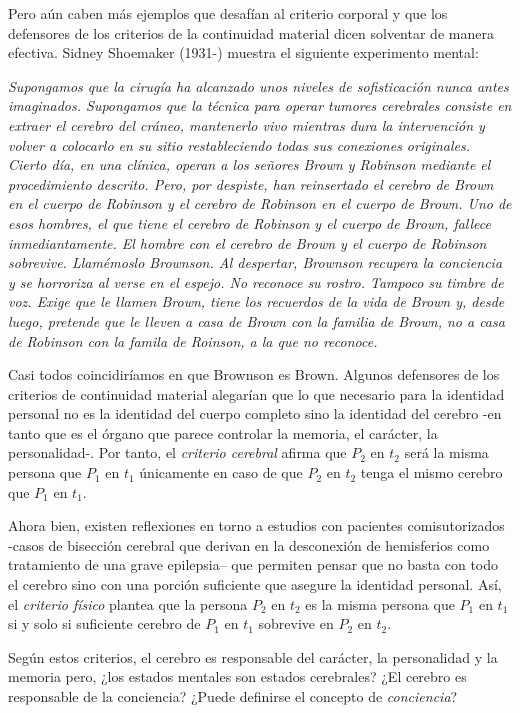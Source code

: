 \documentclass[main.tex]{subfiles}
\begin{document}
Pero aún caben más ejemplos que desafían al criterio corporal y que los defensores de los criterios de la continuidad material dicen solventar de manera efectiva. Sidney Shoemaker (1931-) muestra el siguiente experimento mental:

\textit{Supongamos que la cirugía ha alcanzado unos niveles de sofisticación nunca antes imaginados. Supongamos que la técnica para operar tumores cerebrales consiste en extraer el cerebro del cráneo, mantenerlo vivo mientras dura la intervención y volver a colocarlo en su sitio restableciendo todas sus conexiones originales. Cierto día, en una clínica, operan a los señores Brown y Robinson mediante el procedimiento descrito. Pero, por despiste, han reinsertado el cerebro de Brown en el cuerpo de Robinson y el cerebro de Robinson en el cuerpo de Brown. Uno de esos hombres, el que tiene el cerebro de Robinson y el cuerpo de Brown, fallece inmediantamente. El hombre con el cerebro de Brown y el cuerpo de Robinson sobrevive. Llamémoslo Brownson. Al despertar, Brownson recupera la conciencia y se horroriza al verse en el espejo. No reconoce su rostro. Tampoco su timbre de voz. Exige que le llamen Brown, tiene los recuerdos de la vida de Brown y, desde luego, pretende que le lleven a casa de Brown con la familia de Brown, no a casa de Robinson con la famila de Roinson, a la que no reconoce.
}

Casi todos coincidiríamos en que Brownson es Brown. Algunos defensores de los criterios de continuidad material alegarían que lo que necesario para la identidad personal no es la identidad del cuerpo completo sino la identidad del cerebro -en tanto que es el órgano que parece controlar la memoria, el carácter, la personalidad-. Por tanto, el \textit{criterio cerebral} afirma que $P_{2}$ en $t_{2}$ será la misma persona que $P_{1}$ en $t_{1}$ únicamente en caso de que $P_{2}$ en $t_{2}$ tenga el mismo cerebro que $P_{1}$ en $t_{1}$.



Ahora bien, existen reflexiones en torno a estudios con pacientes comisutorizados  -casos de bisección cerebral que derivan en la desconexión de hemisferios como tratamiento de una grave epilepsia– que permiten pensar que no basta con todo el cerebro sino con una porción suficiente que asegure la identidad personal. Así, el \textit{criterio físico} plantea que la persona $P_{2}$ en $t_{2}$ es la misma persona que $P_{1}$ en $t_{1}$ si y solo si suficiente cerebro de $P_{1}$ en $t_{1}$ sobrevive en $P_{2}$ en $t_{2}$.


Según estos criterios, el cerebro es responsable del carácter, la personalidad y la memoria pero, ¿los estados mentales son estados cerebrales? ¿El cerebro es responsable de la conciencia? ¿Puede definirse el concepto de \textit{conciencia}? 
\end{document}
